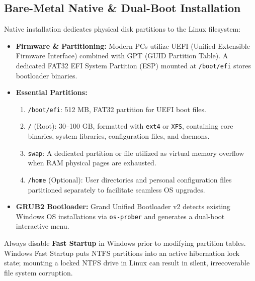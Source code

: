 \subsection{Bare-Metal Native \& Dual-Boot Installation}
Native installation dedicates physical disk partitions to the Linux filesystem:
\begin{itemize}[leftmargin=1.5em]
    \item \textbf{Firmware \& Partitioning:} Modern PCs utilize UEFI (Unified Extensible Firmware Interface) combined with GPT (GUID Partition Table). A dedicated FAT32 EFI System Partition (ESP) mounted at \texttt{/boot/efi} stores bootloader binaries.
    \item \textbf{Essential Partitions:}
    \begin{enumerate}
        \item \texttt{/boot/efi}: 512 MB, FAT32 partition for UEFI boot files.
        \item \texttt{/} (Root): 30--100 GB, formatted with \texttt{ext4} or \texttt{XFS}, containing core binaries, system libraries, configuration files, and daemons.
        \item \texttt{swap}: A dedicated partition or file utilized as virtual memory overflow when RAM physical pages are exhausted.
        \item \texttt{/home} (Optional): User directories and personal configuration files partitioned separately to facilitate seamless OS upgrades.
    \end{enumerate}
    \item \textbf{GRUB2 Bootloader:} Grand Unified Bootloader v2 detects existing Windows OS installations via \texttt{os-prober} and generates a dual-boot interactive menu.
\end{itemize}

\begin{warningbox}
Always disable \textbf{Fast Startup} in Windows prior to modifying partition tables. Windows Fast Startup puts NTFS partitions into an active hibernation lock state; mounting a locked NTFS drive in Linux can result in silent, irrecoverable file system corruption.
\end{warningbox}

